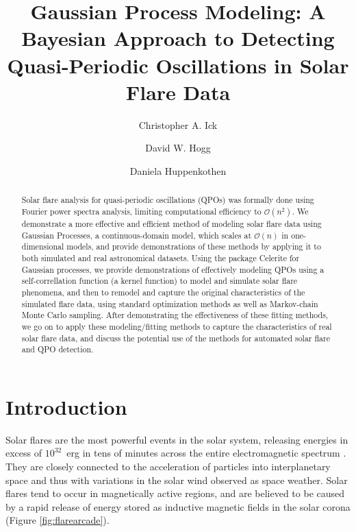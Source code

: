 \documentclass{aastex61}
\begin{document}
\title{Gaussian Process Modeling: A Bayesian Approach to Detecting Quasi-Periodic Oscillations in Solar Flare Data} \label{sec:title and authors}

\author{Christopher A. Ick}

\author{David W. Hogg}

\author{Daniela Huppenkothen}

\begin{abstract} \label{sec:abstract} 
	Solar flare analysis for quasi-periodic oscillations (QPOs)  was formally done using Fourier power spectra analysis, limiting computational efficiency to $\mathcal{O}(n^2)$.
We demonstrate a more effective and efficient method of modeling solar flare data using Gaussian Processes, a continuous-domain model, which scales at $\mathcal{O}(n)$ in one-dimensional models, and provide demonstrations of these methods by applying it to both simulated and real astronomical datasets.
Using the package Celerite for Gaussian processes, we provide demonstrations of effectively modeling QPOs using a self-correllation function (a kernel function) to model and simulate solar flare phenomena, and then to remodel and capture the original characteristics of the simulated flare data, using standard optimization methods as well as Markov-chain Monte Carlo sampling.
After demonstrating the effectiveness of these fitting methods, we go on to apply these modeling/fitting methods to capture the characteristics of real solar flare data, and discuss the potential use of the methods for automated solar flare and QPO detection.
\end{abstract}


\section{Introduction} \label{sec:intro}
Solar flares are the most powerful events in the solar system, releasing energies in excess of $10^{32}$~erg in tens of minutes across the entire electromagnetic spectrum \citep[e.g.\ ][]{fletcher2011}. 
They are closely connected to the acceleration of particles into interplanetary space and thus with variations in the solar wind observed as space weather. 
Solar flares tend to occur in magnetically active regions, and are believed to be caused by a rapid release of energy stored as inductive magnetic fields in the solar corona (Figure \ref{fig:flarearcade}). 
\end{document}

